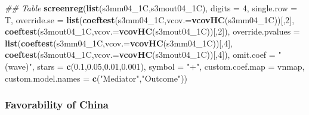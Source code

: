 \documentclass[
]{article}
\newenvironment{Shaded}{\begin{snugshade}}{\end{snugshade}}
\newcommand{\CommentTok}[1]{\textcolor[rgb]{0.56,0.35,0.01}{\textit{#1}}}
\newcommand{\DataTypeTok}[1]{\textcolor[rgb]{0.13,0.29,0.53}{#1}}
\newcommand{\DecValTok}[1]{\textcolor[rgb]{0.00,0.00,0.81}{#1}}
\newcommand{\FloatTok}[1]{\textcolor[rgb]{0.00,0.00,0.81}{#1}}
\newcommand{\KeywordTok}[1]{\textcolor[rgb]{0.13,0.29,0.53}{\textbf{#1}}}
\newcommand{\NormalTok}[1]{#1}
\newcommand{\StringTok}[1]{\textcolor[rgb]{0.31,0.60,0.02}{#1}}
\begin{document}
\begin{Shaded}
\begin{Highlighting}[]
\CommentTok{## Table}
\KeywordTok{screenreg}\NormalTok{(}\KeywordTok{list}\NormalTok{(s3mm04_1C,s3mout04_1C), }\DataTypeTok{digits =} \DecValTok{4}\NormalTok{, }\DataTypeTok{single.row =}\NormalTok{ T,}
          \DataTypeTok{override.se =} \KeywordTok{list}\NormalTok{(}\KeywordTok{coeftest}\NormalTok{(s3mm04_1C,}\DataTypeTok{vcov.=}\KeywordTok{vcovHC}\NormalTok{(s3mm04_1C))[,}\DecValTok{2}\NormalTok{],}
                             \KeywordTok{coeftest}\NormalTok{(s3mout04_1C,}\DataTypeTok{vcov.=}\KeywordTok{vcovHC}\NormalTok{(s3mout04_1C))[,}\DecValTok{2}\NormalTok{]),}
          \DataTypeTok{override.pvalues =} \KeywordTok{list}\NormalTok{(}\KeywordTok{coeftest}\NormalTok{(s3mm04_1C,}\DataTypeTok{vcov.=}\KeywordTok{vcovHC}\NormalTok{(s3mm04_1C))[,}\DecValTok{4}\NormalTok{],}
                                  \KeywordTok{coeftest}\NormalTok{(s3mout04_1C,}\DataTypeTok{vcov.=}\KeywordTok{vcovHC}\NormalTok{(s3mout04_1C))[,}\DecValTok{4}\NormalTok{]),}
          \DataTypeTok{omit.coef =} \StringTok{"(wave)"}\NormalTok{, }\DataTypeTok{stars =} \KeywordTok{c}\NormalTok{(}\FloatTok{0.1}\NormalTok{,}\FloatTok{0.05}\NormalTok{,}\FloatTok{0.01}\NormalTok{,}\FloatTok{0.001}\NormalTok{), }\DataTypeTok{symbol =} \StringTok{"+"}\NormalTok{,}
          \DataTypeTok{custom.coef.map =}\NormalTok{ vnmap, }
          \DataTypeTok{custom.model.names =} \KeywordTok{c}\NormalTok{(}\StringTok{"Mediator"}\NormalTok{,}\StringTok{"Outcome"}\NormalTok{))}
\end{Highlighting}
\end{Shaded}

\hypertarget{favorability-of-china}{%
\subsubsection{Favorability of China}\label{favorability-of-china}}
\end{document}
